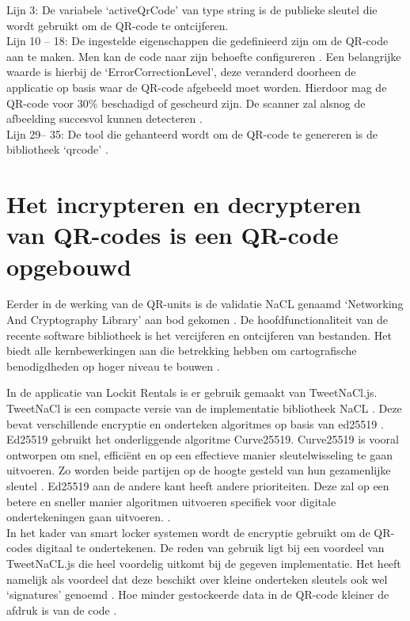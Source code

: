 Lijn 3: De variabele ‘activeQrCode’ van type string is de publieke sleutel die wordt gebruikt om de QR-code te ontcijferen. \\
Lijn 10 – 18: De ingestelde eigenschappen die gedefinieerd zijn om de QR-code aan te maken. Men kan de code naar zijn behoefte configureren \autocite{Sutheebanjard2010}. Een belangrijke waarde is hierbij de ‘ErrorCorrectionLevel’, deze veranderd doorheen de applicatie op basis waar de QR-code afgebeeld moet worden. Hierdoor mag de QR-code voor 30\% beschadigd of gescheurd zijn. De scanner zal alsnog de afbeelding succesvol kunnen detecteren \autocite{Tiwari2016}. \\
Lijn 29– 35: De tool die gehanteerd wordt om de QR-code te genereren is de bibliotheek ‘qrcode’ \autocite{pypi2023}. 

\newpage
\section{Het incrypteren en decrypteren van QR-codes is een QR-code opgebouwd}%
\label{sec:encryptQR-code}

Eerder in de werking van de QR-units is de validatie NaCL genaamd ‘Networking And Cryptography Library’ aan bod gekomen \autocite{Bernstein}. De hoofdfunctionaliteit van de recente software bibliotheek is het vercijferen en ontcijferen van bestanden. Het biedt alle kernbewerkingen aan die betrekking hebben om cartografische benodigdheden op hoger niveau te bouwen \autocite{Bernsteina}.

In de applicatie van Lockit Rentals is er gebruik gemaakt van TweetNaCl.js. TweetNaCl is een compacte versie van de implementatie bibliotheek NaCL \autocite{Bernstein2014} \autocite{Bernsteinb}. Deze bevat verschillende encryptie en onderteken algoritmes op basis van ed25519 \autocite{Bernstein2011}. \\
Ed25519 gebruikt het onderliggende algoritme Curve25519. Curve25519 is vooral ontworpen om snel, efficiënt en op een effectieve manier sleutelwisseling te gaan uitvoeren. Zo worden beide partijen op de hoogte gesteld van hun gezamenlijke sleutel \autocite{Bernstein2006}. Ed25519 aan de andere kant heeft andere prioriteiten. Deze zal op een betere en sneller manier algoritmen uitvoeren specifiek voor digitale ondertekeningen gaan uitvoeren. \autocite{Bernstein2011}. \\
In het kader van smart locker systemen wordt de encryptie gebruikt om de QR-codes digitaal te ondertekenen. De reden van gebruik ligt bij een voordeel van TweetNaCL.js die heel voordelig uitkomt bij de gegeven implementatie. Het heeft namelijk als voordeel dat deze beschikt over kleine onderteken sleutels ook wel ‘signatures’ genoemd \autocite{Bernstein2011}. Hoe minder gestockeerde data in de QR-code kleiner de afdruk is van de code \autocite{Chow2016}.

